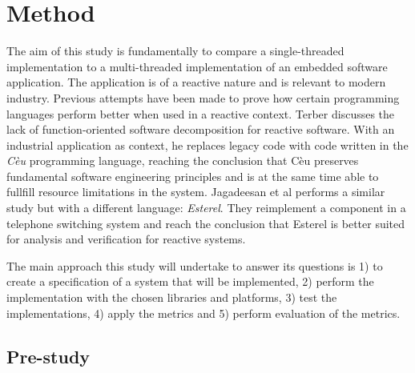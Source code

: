 \chapter{Method}
\label{cha:method}

\iffalse
In this chapter, the method is described in a way which shows how the
work was actually carried out. The description must be precise and
well thought through. Consider the scientific term
replicability. Replicability means that someone reading a scientific
report should be able to follow the method description and then carry
out the same study and check whether the results obtained are
similar. Achieving replicability is not always relevant, but precision
and clarity is.

Sometimes the work is separated into different parts, e.g.  pre-study,
implementation and evaluation. In such cases it is recommended that
the method chapter is structured accordingly with suitable named
sub-headings.
\fi

The aim of this study is fundamentally to compare a single-threaded
implementation to a multi-threaded implementation of an embedded software
application. The application is of a reactive nature and is relevant to modern
industry. Previous attempts have been made to prove how certain programming
languages perform better when used in a reactive context. Terber
\cite{terber2017function} discusses the lack of function-oriented software
decomposition for reactive software. With an industrial application as context,
he replaces legacy code with code written in the \textit{Cèu} programming
language, reaching the conclusion that Cèu preserves fundamental software
engineering principles and is at the same time able to fullfill resource
limitations in the system. Jagadeesan et al \cite{jagadeesan1996formal}
performs a similar study but with a different language: \textit{Esterel}. They
reimplement a component in a telephone switching system and reach the
conclusion that Esterel is better suited for analysis and verification for
reactive systems.

The main approach this study will undertake to answer its questions is 1) to
create a specification of a system that will be implemented, 2) perform the
implementation with the chosen libraries and platforms, 3) test the
implementations, 4) apply the metrics and 5) perform evaluation of the metrics.

\section{Pre-study}

